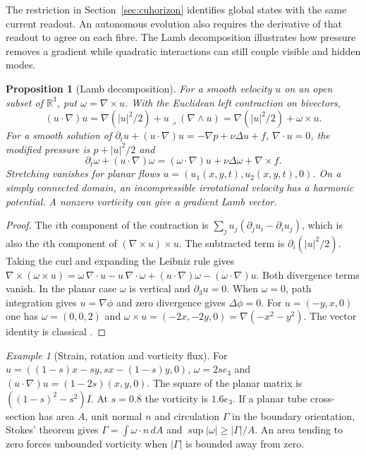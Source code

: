 \documentclass[aps,pra,onecolumn,superscriptaddress,nofootinbib,10pt]{revtex4-2}
\newtheorem{proposition}[theorem]{Proposition}
\theoremstyle{definition}
\theoremstyle{remark}
\newtheorem{example}[theorem]{Example}
\begin{document}
\label{ob:fluid}

The restriction in Section~\ref{sec:cuhorizon} identifies global states with
the same current readout. An autonomous evolution also requires the derivative
of that readout to agree on each fibre. The Lamb decomposition illustrates
how pressure removes a gradient while quadratic interactions can still
couple visible and hidden modes.

\begin{proposition}[Lamb decomposition]
\label{ob:lamb}
For a smooth velocity $u$ on an open subset of $\mathbb R^3$, put
$\omega=\nabla\times u$. With the Euclidean left contraction on bivectors,
\[
 (u\cdot\nabla)u
 =\nabla(|u|^2/2)+u\mathbin{\lrcorner}(\nabla\wedge u)
 =\nabla(|u|^2/2)+\omega\times u.
\]
For a smooth solution of
$\partial_t u+(u\cdot\nabla)u=-\nabla p+\nu\Delta u+f$, $\nabla\cdot u=0$,
the modified pressure is $p+|u|^2/2$ and
\[
 \partial_t\omega+(u\cdot\nabla)\omega
 =(\omega\cdot\nabla)u+\nu\Delta\omega+\nabla\times f .
\]
Stretching vanishes for planar flows $u=(u_1(x,y,t),u_2(x,y,t),0)$.
On a simply connected domain, an incompressible irrotational velocity
has a harmonic potential. A nonzero vorticity can give a gradient Lamb vector.
\end{proposition}
\begin{proof}
The $i$th component of the contraction is
$\sum_j u_j(\partial_j u_i-\partial_i u_j)$, which is also the
$i$th component of $(\nabla\times u)\times u$. The subtracted term
is $\partial_i(|u|^2/2)$. Taking the curl and expanding the Leibniz rule gives
$\nabla\times(\omega\times u)
=\omega\,\nabla\cdot u-u\,\nabla\cdot\omega
 +(u\cdot\nabla)\omega-(\omega\cdot\nabla)u$.
Both divergence terms vanish. In the planar case $\omega$ is vertical and
$\partial_3u=0$. When $\omega=0$, path integration gives $u=\nabla\phi$
and zero divergence gives $\Delta\phi=0$.
For $u=(-y,x,0)$ one has $\omega=(0,0,2)$ and
$\omega\times u=(-2x,-2y,0)=\nabla(-x^2-y^2)$.
The vector identity is classical \cite{obr:Lamb}.
\end{proof}

\begin{example}[Strain, rotation and vorticity flux]
\label{ob:vortexflux}
For $u=((1-s)x-sy,sx-(1-s)y,0)$,
$\omega=2s e_3$ and $(u\cdot\nabla)u=(1-2s)(x,y,0)$.
The square of the planar matrix is $((1-s)^2-s^2)I$.
At $s=0.8$ the vorticity is $1.6 e_3$.
If a planar tube cross-section has area $A$, unit normal $n$ and
circulation $\Gamma$ in the boundary orientation, Stokes' theorem gives
$\Gamma=\int\omega\cdot n\,dA$ and $\sup|\omega|\ge|\Gamma|/A$.
An area tending to zero forces unbounded vorticity when $|\Gamma|$
is bounded away from zero.
\end{example}
\end{document}

